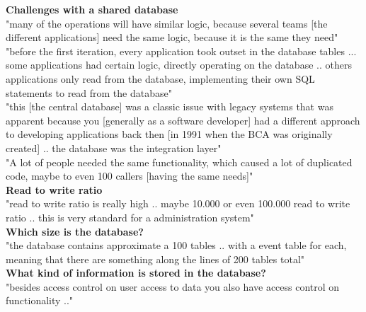 \textbf{Challenges with a shared database}\\
"many of the operations will have similar logic, because several teams [the different applications] need the same logic, because it is the same they need"\\
"before the first iteration, every application took outset in the database tables ... some applications had certain logic, directly operating on the database .. others applications only read from the database, implementing their own SQL statements to read from the database"\\
"this [the central database] was a classic issue with legacy systems that was apparent because you [generally as a software developer] had a different approach to developing applications back then [in 1991 when the BCA was originally created] .. the database was the integration layer"\\
"A lot of people needed the same functionality, which caused a lot of duplicated code, maybe to even 100 callers [having the same needs]"\\


\textbf{Read to write ratio}\\
"read to write ratio is really high .. maybe 10.000 or even 100.000 read to write ratio .. this is very standard for a administration system"\\

\textbf{Which size is the database?}\\
"the database contains approximate a 100 tables .. with a event table for each, meaning that there are something along the lines of 200 tables total"\\

\textbf{What kind of information is stored in the database?}\\
"besides access control on user access to data you also have access control on functionality .."\\